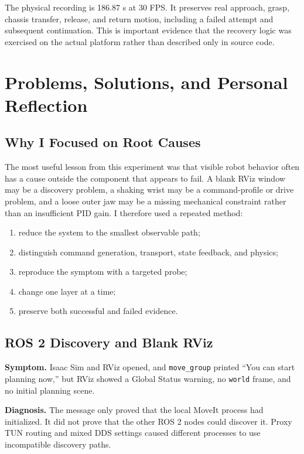 \documentclass[UTF8,zihao=-4,scheme=chinese,fontset=none]{ctexart}
\begin{document}
The physical recording is 186.87 s at 30 FPS. It preserves real approach, grasp, chassis transfer, release, and return motion, including a failed attempt and subsequent continuation. This is important evidence that the recovery logic was exercised on the actual platform rather than described only in source code.

\section{Problems, Solutions, and Personal Reflection}

\subsection{Why I Focused on Root Causes}

The most useful lesson from this experiment was that visible robot behavior often has a cause outside the component that appears to fail. A blank RViz window may be a discovery problem, a shaking wrist may be a command-profile or drive problem, and a loose outer jaw may be a missing mechanical constraint rather than an insufficient PID gain. I therefore used a repeated method:
\begin{enumerate}
\item reduce the system to the smallest observable path;
\item distinguish command generation, transport, state feedback, and physics;
\item reproduce the symptom with a targeted probe;
\item change one layer at a time;
\item preserve both successful and failed evidence.
\end{enumerate}

\subsection{ROS 2 Discovery and Blank RViz}

\textbf{Symptom.} Isaac Sim and RViz opened, and \texttt{move\_group} printed ``You can start planning now,'' but RViz showed a Global Status warning, no \texttt{world} frame, and no initial planning scene.

\textbf{Diagnosis.} The message only proved that the local MoveIt process had initialized. It did not prove that the other ROS 2 nodes could discover it. Proxy TUN routing and mixed DDS settings caused different processes to use incompatible discovery paths.
\end{document}
